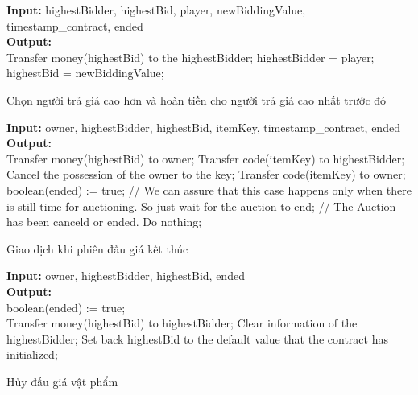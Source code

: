 \documentclass[a4paper]{article}
\begin{document}
\begin{algorithm}
 \textbf{Input:} highestBidder, highestBid, player, newBiddingValue, timestamp\_contract, ended\\
 \textbf{Output:}\\
 
    {
        {
            {
                \State Transfer money(highestBid) to the highestBidder;
            }
            highestBidder = player;\\
            highestBid = newBiddingValue;
        }
    }
    
 \caption{Chọn người trả giá cao hơn và hoàn tiền cho người trả giá cao nhất trước đó}
\end{algorithm}

\begin{algorithm}
 \textbf{Input:} owner, highestBidder, highestBid, itemKey, timestamp\_contract, ended\\
 \textbf{Output:}\\
 
    {
        {
            \State Transfer money(highestBid) to owner;
            \State Transfer code(itemKey) to highestBidder;
            \State Cancel the possession of the owner to the key;
        }
        \Else
        {
            \State Transfer code(itemKey) to owner;
        }
        boolean(ended) := true;
    }
    \Else
    {
        {
            // We can assure that this case happens only when there is still time for auctioning.
            \State So just wait for the auction to end;
        }
        \Else
        {
            // The Auction has been canceld or ended.
            \State Do nothing;
        }
    }
    
 \caption{Giao dịch khi phiên đấu giá kết thúc}
\end{algorithm}

\begin{algorithm}
 \textbf{Input:} owner, highestBidder, highestBid, ended\\
 \textbf{Output:}\\
    {
        boolean(ended) := true;\\
        {
            \State Transfer money(highestBid) to highestBidder;
            \State Clear information of the highestBidder;
            \State Set back highestBid to the default value that the contract has initialized;
        }
    }
    
 \caption{Hủy đấu giá vật phẩm}
\end{algorithm}
\end{document}
